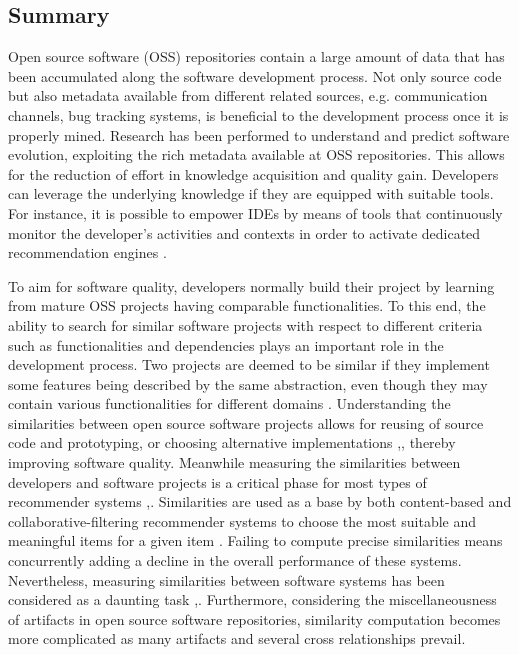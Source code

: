 \subsection{Summary}
Open source software (OSS) repositories contain a large amount of data that has been accumulated along the software development process. Not only source code but also metadata available from different related sources, e.g. communication channels, bug tracking systems, is beneficial to the development process once it is properly mined. Research has been performed to understand and predict software evolution, exploiting the rich metadata available at OSS repositories. This allows for the reduction of effort in knowledge acquisition and quality gain. Developers can leverage the underlying knowledge if they are equipped with suitable tools. For instance, it is possible to empower IDEs by means of tools that continuously monitor the developer's activities and contexts in order to activate dedicated recommendation engines \cite{Ponzanelli:2014:MST:2597073.2597077}. 


To aim for software quality, developers normally build their project by learning from mature OSS projects having comparable functionalities. To this end, the ability to search for similar software projects with respect to different criteria such as functionalities and dependencies plays an important role in the development process. Two projects are deemed to be similar if they implement some features being described by the same abstraction, even though they may contain various functionalities for different domains \cite{McMillan:2012:DSS:2337223.2337267}. Understanding the similarities between open source software projects allows for reusing of source code and prototyping, or choosing alternative implementations \cite{Schafer:2007:CFR:1768197.1768208},\cite{10.1109/SANER.2017.7884605}, thereby improving software quality. Meanwhile measuring the similarities between developers and software projects is a critical phase for most types of recommender systems \cite{DBLP:conf/rweb/NoiaO15},\cite{Sarwar:2001:ICF:371920.372071}. Similarities are used as a base by both content-based and collaborative-filtering recommender systems to choose the most suitable and meaningful items for a given item \cite{Schafer:2007:CFR:1768197.1768208}. Failing to compute precise similarities means concurrently adding a decline in the overall performance of these systems. Nevertheless, measuring similarities between software systems has been considered as a daunting task \cite{Chen:2015:SFD:2684822.2685305},\cite{McMillan:2012:DSS:2337223.2337267}. Furthermore, considering the miscellaneousness of artifacts in open source software repositories, similarity computation becomes more complicated as many artifacts and several cross relationships prevail.

